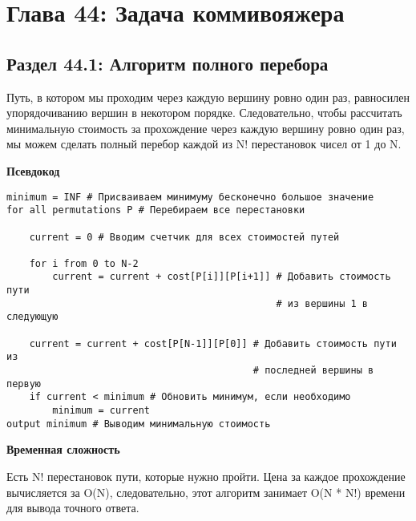 \chapter*{Глава 44: Задача коммивояжера}

\vspace{\baselineskip}
\section*{Раздел 44.1: Алгоритм полного перебора}

\vspace{\baselineskip}
Путь, в котором мы проходим через каждую вершину ровно один раз, равносилен упорядочиванию вершин в некотором порядке. Следовательно, чтобы рассчитать минимальную стоимость за прохождение через каждую вершину ровно один раз, мы можем сделать полный перебор каждой из N! перестановок чисел от 1 до N.

\vspace{\baselineskip}
\textbf{Псевдокод}

\vspace{\baselineskip}
\begin{tcolorbox}
\begin{verbatim}
minimum = INF # Присваиваем минимуму бесконечно большое значение
for all permutations P # Перебираем все перестановки

	current = 0 # Вводим счетчик для всех стоимостей путей

	for i from 0 to N-2        
	    current = current + cost[P[i]][P[i+1]] # Добавить стоимость пути
	                                           # из вершины 1 в следующую
       
	current = current + cost[P[N-1]][P[0]] # Добавить стоимость пути из 
                                    	   # последней вершины в первую
	if current < minimum # Обновить минимум, если необходимо        
		minimum = current   
output minimum # Выводим минимальную стоимость 
\end{verbatim}
\end{tcolorbox}

\vspace{\baselineskip}
\textbf{Временная сложность}

\vspace{\baselineskip}
Есть N! перестановок пути, которые нужно пройти. Цена за каждое прохождение вычисляется за O(N), следовательно, этот алгоритм занимает O(N * N!) времени для вывода точного ответа.

